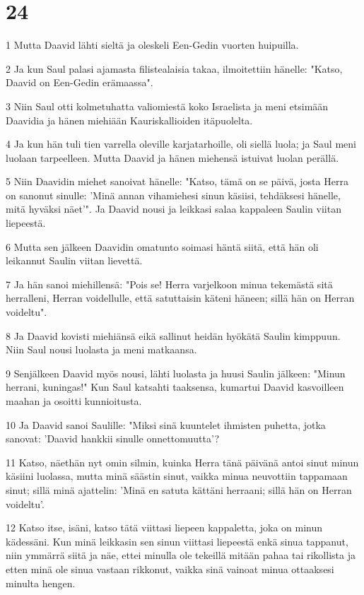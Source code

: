 \chapter{24}

\par 1 Mutta Daavid lähti sieltä ja oleskeli Een-Gedin vuorten huipuilla.
\par 2 Ja kun Saul palasi ajamasta filistealaisia takaa, ilmoitettiin hänelle: "Katso, Daavid on Een-Gedin erämaassa".
\par 3 Niin Saul otti kolmetuhatta valiomiestä koko Israelista ja meni etsimään Daavidia ja hänen miehiään Kauriskallioiden itäpuolelta.
\par 4 Ja kun hän tuli tien varrella oleville karjatarhoille, oli siellä luola; ja Saul meni luolaan tarpeelleen. Mutta Daavid ja hänen miehensä istuivat luolan perällä.
\par 5 Niin Daavidin miehet sanoivat hänelle: "Katso, tämä on se päivä, josta Herra on sanonut sinulle: 'Minä annan vihamiehesi sinun käsiisi, tehdäksesi hänelle, mitä hyväksi näet'". Ja Daavid nousi ja leikkasi salaa kappaleen Saulin viitan liepeestä.
\par 6 Mutta sen jälkeen Daavidin omatunto soimasi häntä siitä, että hän oli leikannut Saulin viitan lievettä.
\par 7 Ja hän sanoi miehillensä: "Pois se! Herra varjelkoon minua tekemästä sitä herralleni, Herran voidellulle, että satuttaisin käteni häneen; sillä hän on Herran voideltu".
\par 8 Ja Daavid kovisti miehiänsä eikä sallinut heidän hyökätä Saulin kimppuun. Niin Saul nousi luolasta ja meni matkaansa.
\par 9 Senjälkeen Daavid myös nousi, lähti luolasta ja huusi Saulin jälkeen: "Minun herrani, kuningas!" Kun Saul katsahti taaksensa, kumartui Daavid kasvoilleen maahan ja osoitti kunnioitusta.
\par 10 Ja Daavid sanoi Saulille: "Miksi sinä kuuntelet ihmisten puhetta, jotka sanovat: 'Daavid hankkii sinulle onnettomuutta'?
\par 11 Katso, näethän nyt omin silmin, kuinka Herra tänä päivänä antoi sinut minun käsiini luolassa, mutta minä säästin sinut, vaikka minua neuvottiin tappamaan sinut; sillä minä ajattelin: 'Minä en satuta kättäni herraani; sillä hän on Herran voideltu'.
\par 12 Katso itse, isäni, katso tätä viittasi liepeen kappaletta, joka on minun kädessäni. Kun minä leikkasin sen sinun viittasi liepeestä enkä sinua tappanut, niin ymmärrä siitä ja näe, ettei minulla ole tekeillä mitään pahaa tai rikollista ja etten minä ole sinua vastaan rikkonut, vaikka sinä vainoat minua ottaaksesi minulta hengen.
